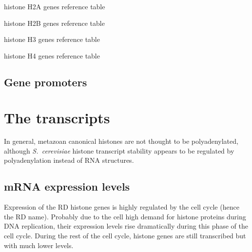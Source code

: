 \documentclass[10pt,a4paper,draft]{article}
\begin{document}
      \begin{table}
        \centering
        
        \caption{histone H2A genes reference table}
        \label{tab:H2A-ref}
      \end{table}

      \begin{table}
        \centering
        
        \caption{histone H2B genes reference table}
        \label{tab:H2B-ref}
      \end{table}

      \begin{table}
        \centering
        
        \caption{histone H3 genes reference table}
        \label{tab:H3-ref}
      \end{table}

      \begin{table}
        \centering
        
        \caption{histone H4 genes reference table}
        \label{tab:H4-ref}
      \end{table}


    \subsection{Gene promoters}

  \section{The transcripts}

    In general, metazoan canonical histones
    are not thought to be polyadenylated, although \textit{S.\ cerevisiae} histone transcript stability
    appears to be regulated by polyadenylation instead of RNA structures.

    \subsection{mRNA expression levels}
      Expression of the RD histone genes is highly regulated by the cell cycle (hence the RD name). Probably due
      to the cell high demand for histone proteins during DNA replication, their expression levels rise dramatically
      during this phase of the cell cycle. During the rest of the cell cycle, histone genes are still transcribed
      but with much lower levels.
\end{document}
